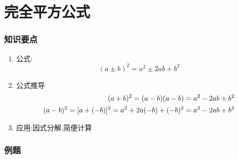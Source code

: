 \documentclass[cn,blue,12pt]{elegantbook}
\begin{document}
\section{完全平方公式}%

\subsubsection{知识要点}%
\label{ssub:知识要点}

\begin{enumerate}
    \item 公式:
        \begin{equation}
            (a \pm b)^2 = a^2 \pm 2ab + b^2
        \end{equation}

    \item 公式推导
        \begin{eqnarray}
            (a+b)^2=(a-b)(a-b)=a^2-2ab+b^2 \notag \\
            (a-b)^2=[a+(-b)]^2=a^2+2a(-b)+(-b)^2=a^2-2ab+b^2 \notag
        \end{eqnarray}
    \item 应用:因式分解,简便计算
\end{enumerate}

\subsubsection{例题}%
\label{ssub:例题}
\end{document}
